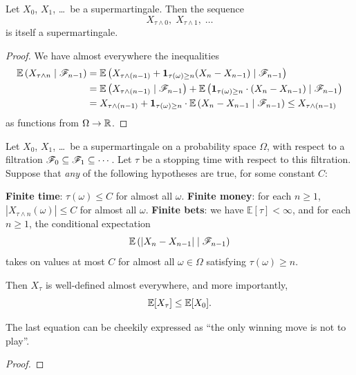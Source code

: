 \begin{proposition}
	Let $X_0$, $X_1$, \dots\ be a supermartingale.
	Then the sequence
	\[ X_{\tau \wedge 0}, \; X_{\tau \wedge 1}, \; \dots \]
	is itself a supermartingale.
\end{proposition}
\begin{proof}
	We have almost everywhere the inequalities
	\begin{align*}
		\mathbb E\left( X_{\tau \wedge n} \mid \mathscr F_{n-1} \right)
		&= \mathbb E \left( X_{\tau \wedge (n-1)} + \mathbf 1_{\tau(\omega) \ge n} (X_n - X_{n-1}) \mid \mathscr F_{n-1} \right) \\
		&= \mathbb E \left( X_{\tau \wedge (n-1)} \mid \mathscr F_{n-1} \right)
		+ \mathbb E \left( \mathbf 1_{\tau(\omega) \ge n} \cdot (X_n - X_{n-1}) \mid \mathscr F_{n-1} \right) \\
		&= X_{\tau \wedge (n-1)} + \mathbf 1_{\tau(\omega) \ge n}
			\cdot\mathbb E \left(  X_n - X_{n-1} \mid \mathscr F_{n-1} \right)
		\le X_{\tau \wedge (n-1)}
	\end{align*}
	as functions from $\Omega \to \mathbb R$.
\end{proof}

\begin{theorem}
	Let $X_0$, $X_1$, \dots\ be a supermartingale on a probability space $\Omega$,
	with respect to a filtration $\mathscr F_0 \subseteq \mathscr F_1 \subseteq \cdots$.
	Let $\tau$ be a stopping time with respect to this filtration.
	Suppose that \emph{any} of the following hypotheses are true,
	for some constant $C$:
	\begin{enumerate}[(a)]
		\ii \textbf{Finite time}: $\tau(\omega) \le C$ for almost all $\omega$.
		\ii \textbf{Finite money}: for each $n \ge 1$,
		$\left\lvert X_{\tau \wedge n}(\omega) \right\rvert \le C$
		for almost all $\omega$.
		\ii \textbf{Finite bets}: we have $\mathbb E[\tau] < \infty$,
		and for each $n \ge 1$, the conditional expectation
		\[ \mathbb E\left( \left\lvert X_n-X_{n-1} \right\rvert
			\mid \mathscr F_{n-1} \right) \]
		takes on values at most $C$ for almost all $\omega \in \Omega$
		satisfying $\tau(\omega) \ge n$.
	\end{enumerate}
	Then $X_\tau$ is well-defined almost everywhere,
	and more importantly, \[ \mathbb E[X_\tau] \le \mathbb E[X_0]. \]
\end{theorem}
The last equation can be cheekily expressed as
``the only winning move is not to play''.

\begin{proof}
\end{proof}


